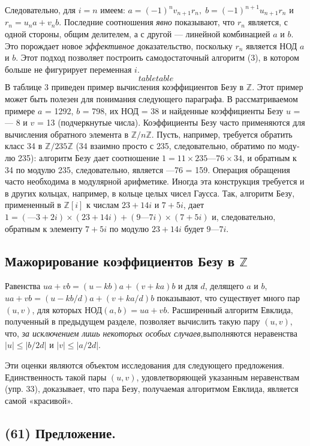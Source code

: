 \documentclass{mai_book}
\begin{document}
Следовательно, для $i=n$ имеем: $a=(-1)^nv_{n+1}r_{n},\;b=(-1)^{n+1}u_{n+1}r_{n}$ и $r_{n}=u_{n}a+v_{n}b$. Последние соотношения \textit{явно} показывают, что $r_{n}$ является, с одной стороны, общим делителем, а с другой — линейной
комбинацией $a$ и $b$. Это порождает новое \textit{эффективное} доказательство,
поскольку $r_{n}$ является НОД $a$ и $b$.
Этот подход позволяет построить самодостаточный алгоритм (3),
в котором больше не фигурирует переменная $i$.
$$tabletable$$
В таблице 3 приведен пример вычисления коэффициентов Безу в $\mathbb{Z}$. Этот пример может быть полезен для понимания следующего парагра­фа. В рассматриваемом примере $a$ = 1292, $b$ = 798, их НОД = 38 и найденные коэффициенты Безу $u$ = — 8 и $v$ = 13 (подчеркнутые числа).
\newpage
Коэффициенты Безу часто применяются для вычисления обратного элемента в $\mathbb{Z} /n\mathbb{Z}$. Пусть, например, требуется обратить класс 34 в $\mathbb{Z}/235\mathbb{Z}$ (34 взаимно просто с 235, следовательно, обратимо по моду­
лю 235): алгоритм Безу дает соотношение $1 = 11\times235 — 76\times34$, и
обратным к 34 по модулю 235, следовательно, является —76 = 159. Опе­рация обращения часто необходима в модулярной арифметике. Иногда эта конструкция требуется и в других кольцах, например, в кольце целых чисел Гаусса. Так, алгоритм Безу, примененный в $\mathbb{Z}[i]$ к числам $23 + 14i$ и $7 + 5i$, дает $1=(—3 + 2i)\times(23+14i)+(9—7i)\times(7+5i)$ и, сле­довательно, обратным к элементу $7 + 5i$ по модулю $23+14i$ будет $9—7i$.
\subsection{Мажорирование коэффициентов Безу в $\mathbb{Z}$}
Равенства $ua+vb=(u-kb)a+(v+ka)b$ и для $d$, делящего $a$ и $b$, $ua+vb=(u-kb/d)a+(v+ka/d)b$ показывают, что существует много пар $(u,v)$, для которых НОД$(a,b)=ua+vb$. Расширенный алгоритм Евклида, полученный в предыдущем разделе, позволяет вычислить такую пару $(u,v)$, что, \textit{за исключением лишь некоторых особых случаев,}выполняются неравенства $|u|\leqslant|b/2d|$ и $|v|\leqslant|a/2d|$.

Эти оценки являются объектом исследования для следующего предложения. Единственность такой пары $(u,v)$, удовлетворяющей указанным неравенствам (упр. 33), доказывает, что пара Безу, получаемая
алгоритмом Евклида, является самой «красивой».
\subsection*{(61) Предложение.}
\end{document}
